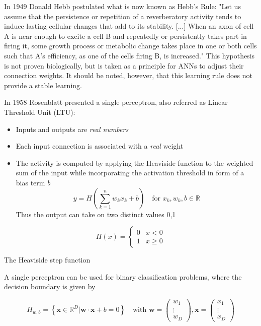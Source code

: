 \documentclass[11pt]{article}
\begin{document}
In 1949 Donald Hebb postulated what is now known as Hebb's Rule:
"Let us assume that the persistence or repetition of a reverberatory activity tends to induce lasting cellular changes that add to its stability. [...] When an axon of cell A is near enough to excite a cell B and repeatedly or persistently takes part in firing it, some growth process or metabolic change takes place in one or both cells such that A's efficiency, as one of the cells firing B, is increased."
This hypothesis is not proven biologically, but is taken as a principle for ANNs to adjust their connection weights. It should be noted, however, that this learning rule does not provide a stable learning.

In 1958 Rosenblatt presented a single perceptron, also referred as Linear Threshold Unit (LTU):

\begin{itemize}
	\item Inputs and outputs are \emph{real numbers}
	\item Each input connection is associated with a \emph{real} weight
	\item The activity is computed by applying the Heaviside function to the weighted sum of the input while incorporating the activation threshold in form of a bias term $b$
	\begin{equation*}
		y = H\left(\sum_{k=1}^{n} w_k x_k + b \right)\quad\text{for } x_k,w_k,b\in\mathbb{R}
	\end{equation*}
	Thus the output can take on two distinct values {0,1}
\end{itemize}

\begin{equ}[H]
	\begin{equation*}
		H(x) = \left\{\begin{matrix}
			0 & x<0\\
			1 & x\geq 0
		\end{matrix}\right.
	\end{equation*}
	\caption{The Heaviside step function}
\end{equ}

A single perceptron can be used for binary classification problems, where the decision boundary is given by

\begin{equation*}
	H_{w,b} = \left\{ \textbf{x} \in \mathbb{R}^D | \textbf{w} \cdot \textbf{x} + b = 0 \right\}\quad\text{with }\textbf{w}=\begin{pmatrix}
		w_1\\
		\vdots\\
		w_D
	\end{pmatrix},
	\textbf{x} = \begin{pmatrix}
	x_1\\
	\vdots\\
	x_D
	\end{pmatrix}
\end{equation*}
\end{document}
